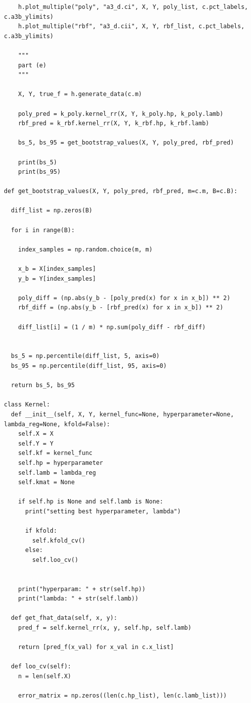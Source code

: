\documentclass{article}
\newcommand{\1}{\mathbf{1}}
\begin{document}
{\begin{verbatim}
    h.plot_multiple("poly", "a3_d.ci", X, Y, poly_list, c.pct_labels, c.a3b_ylimits)
    h.plot_multiple("rbf", "a3_d.cii", X, Y, rbf_list, c.pct_labels, c.a3b_ylimits)

    """
    part (e)
    """

    X, Y, true_f = h.generate_data(c.m)

    poly_pred = k_poly.kernel_rr(X, Y, k_poly.hp, k_poly.lamb)
    rbf_pred = k_rbf.kernel_rr(X, Y, k_rbf.hp, k_rbf.lamb)

    bs_5, bs_95 = get_bootstrap_values(X, Y, poly_pred, rbf_pred)

    print(bs_5)
    print(bs_95)

def get_bootstrap_values(X, Y, poly_pred, rbf_pred, m=c.m, B=c.B):
  
  diff_list = np.zeros(B)

  for i in range(B):
    
    index_samples = np.random.choice(m, m)

    x_b = X[index_samples]
    y_b = Y[index_samples]

    poly_diff = (np.abs(y_b - [poly_pred(x) for x in x_b]) ** 2)
    rbf_diff = (np.abs(y_b - [rbf_pred(x) for x in x_b]) ** 2)

    diff_list[i] = (1 / m) * np.sum(poly_diff - rbf_diff)


  bs_5 = np.percentile(diff_list, 5, axis=0)
  bs_95 = np.percentile(diff_list, 95, axis=0)

  return bs_5, bs_95

class Kernel:
  def __init__(self, X, Y, kernel_func=None, hyperparameter=None, lambda_reg=None, kfold=False):
    self.X = X
    self.Y = Y
    self.kf = kernel_func
    self.hp = hyperparameter
    self.lamb = lambda_reg
    self.kmat = None

    if self.hp is None and self.lamb is None:
      print("setting best hyperparameter, lambda")

      if kfold:
        self.kfold_cv()
      else:
        self.loo_cv()
      

    print("hyperparam: " + str(self.hp))
    print("lambda: " + str(self.lamb))

  def get_fhat_data(self, x, y):
    pred_f = self.kernel_rr(x, y, self.hp, self.lamb)

    return [pred_f(x_val) for x_val in c.x_list]

  def loo_cv(self):
    n = len(self.X)

    error_matrix = np.zeros((len(c.hp_list), len(c.lamb_list)))


\end{verbatim}}
\end{document}
